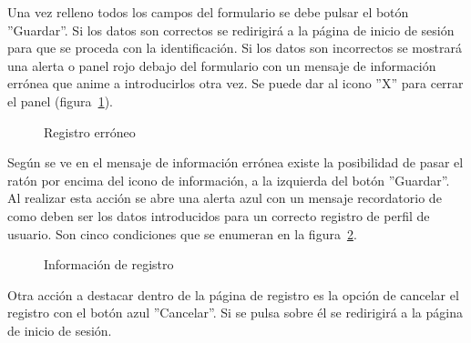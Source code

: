 \documentclass[a4paper, 12pt]{book}
\begin{document}
Una vez relleno todos los campos del formulario se debe pulsar el bot\'on ''Guardar''. Si los datos son correctos se redirigir\'a a la p\'agina de inicio
de sesi\'on para que se proceda con la identificaci\'on. Si los datos son incorrectos se mostrar\'a una alerta o panel rojo debajo del formulario con un 
mensaje de informaci\'on err\'onea que anime a introducirlos otra vez. Se puede dar al icono ''X'' para cerrar el panel 
(figura~\ref{figura:registro2}).
\begin{figure}[htbp] 
  \centering
  \caption{Registro err\'oneo}
  \label{figura:registro2}
\end{figure}

Seg\'un se ve en el mensaje de informaci\'on err\'onea existe la posibilidad de pasar el rat\'on por encima del icono de informaci\'on, a la izquierda del 
bot\'on ''Guardar''. Al realizar esta acci\'on se abre una alerta azul con un mensaje recordatorio de como deben ser los datos introducidos para un correcto
registro de perfil de usuario. Son cinco condiciones que se enumeran en la figura~\ref{figura:registro3}.
\begin{figure}[htbp] 
  \centering
  \caption{Informaci\'on de registro}
  \label{figura:registro3}
\end{figure}

Otra acci\'on a destacar dentro de la p\'agina de registro es la opci\'on de cancelar el registro con el bot\'on azul ''Cancelar''. Si se pulsa sobre \'el se
redirigir\'a a la p\'agina de inicio de sesi\'on.
\end{document}
